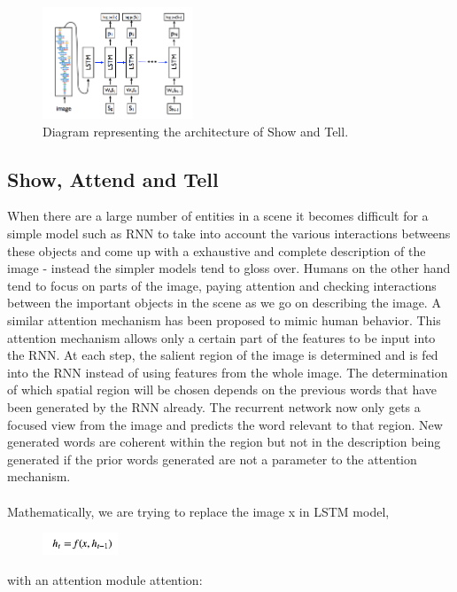 \documentclass[a4paper]{article}
\begin{document}
\begin{figure}
\centering
\includegraphics[width=0.4\textwidth]{sc1.png}
\caption{\label{fig:arch}Diagram representing the architecture of Show and Tell.}
\end{figure}

\subsection{Show, Attend and Tell}
When there are a large number of entities in a scene it becomes difficult for a simple model such as RNN to take into account the various interactions betweens these objects and come up with a exhaustive and complete description of the image - instead the simpler models tend to gloss over. Humans on the other hand tend to focus on parts of the image, paying attention and checking interactions between the important objects in the scene as we go on describing the image. A similar attention mechanism has been proposed to mimic human behavior\cite{DBLP:journals/corr/XuBKCCSZB15}. This attention mechanism allows only a certain part of the features to be input into the RNN. At each step, the salient region of the image is determined and is fed into the RNN instead of using features from the whole image. The determination of which spatial region will be chosen depends on the previous words that have been generated by the RNN already. The recurrent network now only gets a focused view from the image and predicts the word relevant to that region. New generated words are coherent within the region but not in the description being generated if the prior words generated are not a parameter to the attention mechanism.\\
\\
Mathematically, we are trying to replace the image x in LSTM model,
\begin{figure}[H]
\centering
\includegraphics[width=0.2\textwidth]{1.png}
\end{figure}
\noindent with an attention module attention:
\end{document}
